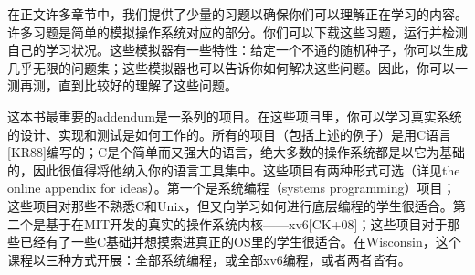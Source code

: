 在正文许多章节中，我们提供了少量的习题以确保你们可以理解正在学习的内容。许多习题是简单的模拟操作系统对应的部分。你们可以下载这些习题，运行并检测自己的学习状况。这些模拟器有一些特性：给定一个不通的随机种子，你可以生成几乎无限的问题集；这些模拟器也可以告诉你如何解决这些问题。因此，你可以一测再测，直到比较好的理解了这些问题。

这本书最重要的addendum是一系列的项目。在这些项目里，你可以学习真实系统的设计、实现和测试是如何工作的。所有的项目（包括上述的例子）是用C语言[KR88]编写的；C是个简单而又强大的语言，绝大多数的操作系统都是以它为基础的，因此很值得将他纳入你的语言工具集中。这些项目有两种形式可选（详见the online appendix for ideas）。第一个是系统编程（systems programming）项目；这些项目对那些不熟悉C和Unix，但又向学习如何进行底层编程的学生很适合。第二个是基于在MIT开发的真实的操作系统内核——xv6[CK+08]；这些项目对于那些已经有了一些C基础并想摸索进真正的OS里的学生很适合。在Wisconsin，这个课程以三种方式开展：全部系统编程，或全部xv6编程，或者两者皆有。


